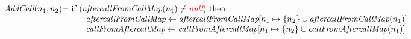 \[\begin{array}{l@{}l@{~}l}
\emph{AddCall}(n_1,n_2)
	& = & \mbox{if}\ (\emph{aftercallFromCallMap}(n_1) \neq \nullK)\ \mbox{then}\\
	& & \phantom{else} \emph{aftercallFromCallMap} \leftarrow \emph{aftercallFromCallMap}[n_1 \mapsto \{n_2\}\cup \emph{aftercallFromCallMap}(n_1)]\\
	& & \phantom{else} \emph{callFromAftercallMap} \leftarrow \emph{callFromAftercallMap}[n_1 \mapsto \{n_2\}\cup \emph{callFromAftercallMap}(n_1)]\\
	& & \\


\end{array}
\]


